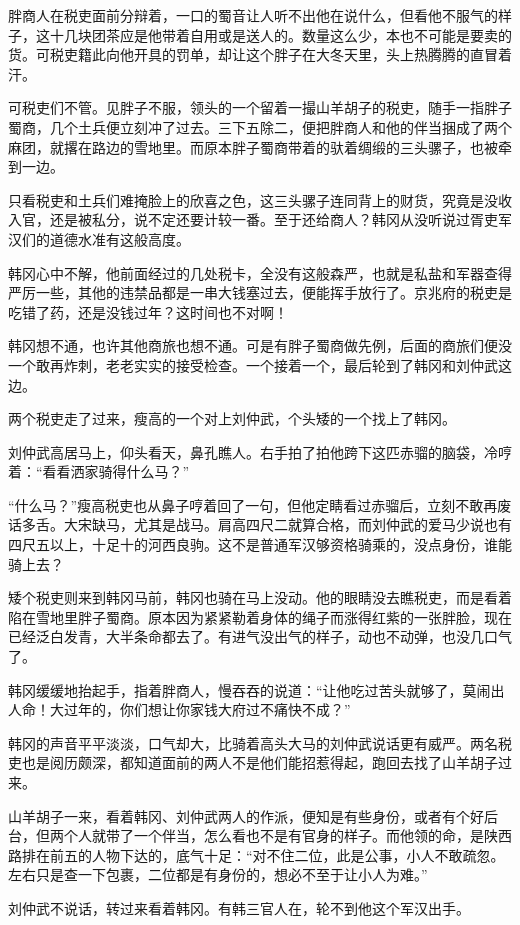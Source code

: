 胖商人在税吏面前分辩着，一口的蜀音让人听不出他在说什么，但看他不服气的样子，这十几块团茶应是他带着自用或是送人的。数量这么少，本也不可能是要卖的货。可税吏籍此向他开具的罚单，却让这个胖子在大冬天里，头上热腾腾的直冒着汗。

可税吏们不管。见胖子不服，领头的一个留着一撮山羊胡子的税吏，随手一指胖子蜀商，几个土兵便立刻冲了过去。三下五除二，便把胖商人和他的伴当捆成了两个麻团，就撂在路边的雪地里。而原本胖子蜀商带着的驮着绸缎的三头骡子，也被牵到一边。

只看税吏和土兵们难掩脸上的欣喜之色，这三头骡子连同背上的财货，究竟是没收入官，还是被私分，说不定还要计较一番。至于还给商人？韩冈从没听说过胥吏军汉们的道德水准有这般高度。

韩冈心中不解，他前面经过的几处税卡，全没有这般森严，也就是私盐和军器查得严厉一些，其他的违禁品都是一串大钱塞过去，便能挥手放行了。京兆府的税吏是吃错了药，还是没钱过年？这时间也不对啊！

韩冈想不通，也许其他商旅也想不通。可是有胖子蜀商做先例，后面的商旅们便没一个敢再炸刺，老老实实的接受检查。一个接着一个，最后轮到了韩冈和刘仲武这边。

两个税吏走了过来，瘦高的一个对上刘仲武，个头矮的一个找上了韩冈。

刘仲武高居马上，仰头看天，鼻孔瞧人。右手拍了拍他跨下这匹赤骝的脑袋，冷哼着：“看看洒家骑得什么马？”

“什么马？”瘦高税吏也从鼻子哼着回了一句，但他定睛看过赤骝后，立刻不敢再废话多舌。大宋缺马，尤其是战马。肩高四尺二就算合格，而刘仲武的爱马少说也有四尺五以上，十足十的河西良驹。这不是普通军汉够资格骑乘的，没点身份，谁能骑上去？

矮个税吏则来到韩冈马前，韩冈也骑在马上没动。他的眼睛没去瞧税吏，而是看着陷在雪地里胖子蜀商。原本因为紧紧勒着身体的绳子而涨得红紫的一张胖脸，现在已经泛白发青，大半条命都去了。有进气没出气的样子，动也不动弹，也没几口气了。

韩冈缓缓地抬起手，指着胖商人，慢吞吞的说道：“让他吃过苦头就够了，莫闹出人命！大过年的，你们想让你家钱大府过不痛快不成？”

韩冈的声音平平淡淡，口气却大，比骑着高头大马的刘仲武说话更有威严。两名税吏也是阅历颇深，都知道面前的两人不是他们能招惹得起，跑回去找了山羊胡子过来。

山羊胡子一来，看着韩冈、刘仲武两人的作派，便知是有些身份，或者有个好后台，但两个人就带了一个伴当，怎么看也不是有官身的样子。而他领的命，是陕西路排在前五的人物下达的，底气十足：“对不住二位，此是公事，小人不敢疏忽。左右只是查一下包裹，二位都是有身份的，想必不至于让小人为难。”

刘仲武不说话，转过来看着韩冈。有韩三官人在，轮不到他这个军汉出手。

